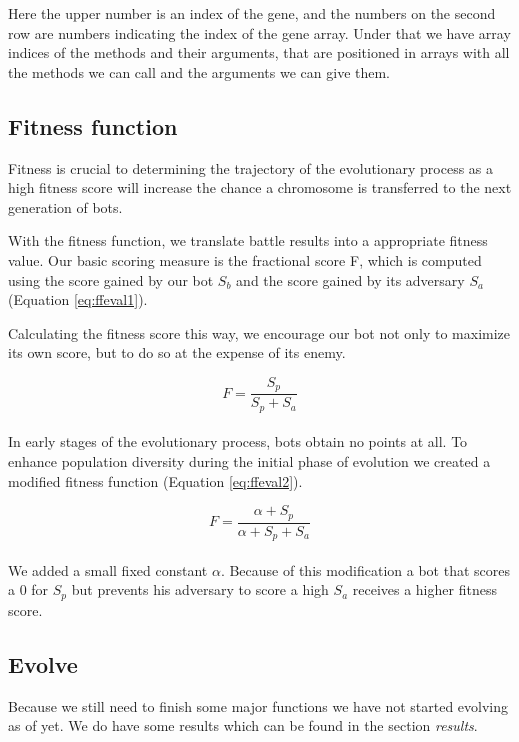 \documentclass[a4paper,10pt]{article}
\begin{document}
Here the upper number is an index of the gene, and the numbers on the second row are numbers indicating the index of the gene array. Under that we have array indices of the methods and their arguments, that are positioned in arrays with all the methods we can call and the arguments we can give them.


\subsection{Fitness function}
Fitness is crucial to determining the trajectory of the evolutionary process as a high fitness score will increase the chance a chromosome is transferred to the next generation of bots.

With the fitness function, we translate battle results into a appropriate fitness value. Our basic scoring measure is the fractional score F, which is computed using the score gained by our bot $S_b$ and the score gained by its adversary $S_a$ (Equation \ref{eq:ffeval1}).

Calculating the fitness score this way, we encourage our bot not only to maximize its own score, but to do so at the expense of its enemy.

\begin{equation}
F = \frac{S_p}{S_p + S_a}
    \label{eq:ffeval1}
\end{equation} \\

In early stages of the evolutionary process, bots obtain no points at all. To enhance population diversity during the initial phase of evolution we created a modified fitness function (Equation \ref{eq:ffeval2}).

\begin{equation}
F = \frac{\alpha+S_p}{\alpha+S_p + S_a}
     \label{eq:ffeval2}
\end{equation} \\

We added a small fixed constant $\alpha$. Because of this modification a bot that scores a 0 for $S_p$ but prevents his adversary to score a high $S_a$ receives a higher fitness score.

\subsection{Evolve}
Because we still need to finish some major functions we have not started evolving as of yet. We do have some results which can be found in the section \textit{results}. 
\end{document}
